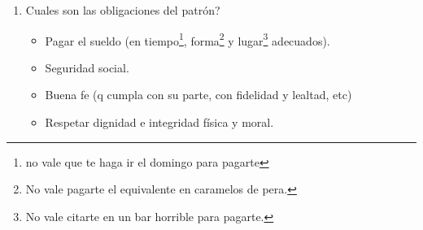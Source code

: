 \documentclass[spanish,12pt,a4paper,titlepage]{report}
\begin{document}
\begin{enumerate}
\begin{itemize}
    \begin{itemize}
    \item No rompas todo, ni te rompas la cara.
    \end{itemize}
  \item Obligación de obediencia.
    \begin{itemize}
    \item Siempre q las órdenes, sean razonables, seguras y higiénicas, seguílas. Si una orden contradice la de un superior, entonces no lo hagas. Si es imposible, tampoco.
    \end{itemize}
  \item  Obligación de fidelidad.
    \begin{itemize}
    \item Es algo moral, no está escrito.
    \item No revelar secretos (a veces hay claúsulas de conf.)
    \item No aceptar gratificaciones, regalos, ventajas de terceros, exceptuando propinas.
    \end{itemize}
  \item No realizar concurrencia desleal ni colaborar con quienes lo hagan.
    \begin{itemize}
    \item No hagas algo parecido a lo que hacés en el trabajo, y q le haga competencia real/potencial a tu jefe.
    \end{itemize}
  \item Obligación moral (consideración a los otros trabajadores, al jefe etc. Es decir, portate bien, no seas bostero.
  \item Buena fe\footnote{Es uno de los principios de la relación de trabajo.} (cumplir honestamente con con tu parte del contrato de trabajo)
  \end{itemize}
\item Cuales son las obligaciones del patrón?
  \begin{itemize}
  \item Pagar el sueldo (en tiempo\footnote{no vale que te haga ir el domingo para pagarte}, forma\footnote{No vale pagarte el equivalente en caramelos de pera.} y lugar\footnote{No vale citarte en un bar horrible para pagarte.} adecuados).
  \item Seguridad social.
  \item Buena fe (q cumpla con su parte, con fidelidad y lealtad, etc)
  \item Respetar dignidad e integridad física y moral.

\end{itemize}
\end{enumerate}
\end{document}
